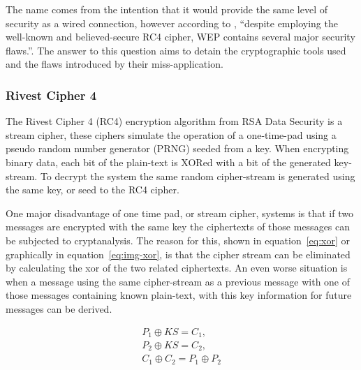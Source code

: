 \documentclass[pdftex, 11pt, a4paper]{article}
\begin{document}
The name comes from the intention that it would provide the same level of security as a wired connection, however according to \textcite{intercepting-wifi}, ``despite employing the well-known and believed-secure RC4 cipher, WEP contains several major security flaws.''.  The answer to this question aims to detain the cryptographic tools used and the flaws introduced by their miss-application.

\subsubsection{Rivest Cipher 4}
The Rivest Cipher 4 (RC4) encryption algorithm from RSA Data Security is a stream cipher, these ciphers simulate the operation of a one-time-pad using a pseudo random number generator (PRNG) seeded from a key\cite{otp-faq}. When encrypting binary data, each bit of the plain-text is XORed with a bit of the generated key-stream. To decrypt the system the same random cipher-stream is generated using the same key, or seed to the RC4 cipher.

One major disadvantage of one time pad, or stream cipher, systems is that if two messages are encrypted with the same key the ciphertexts of those messages can be subjected to cryptanalysis.  The reason for this, shown in equation~\ref{eq:xor} or graphically in equation~\ref{eq:img-xor}, is that the cipher stream can be eliminated by calculating the xor of the two related ciphertexts. An even worse situation is when a message using the same cipher-stream as a previous message with one of those messages containing known plain-text, with this key information for future messages can be derived.

\begin{subequations}
    \begin{align}
        P_1 \oplus KS = C_1,\\
        P_2 \oplus KS = C_2,\\
        C_1 \oplus C_2 = P_1 \oplus P_2\label{eq:xor}
    \end{align}
\end{subequations}
\end{document}

